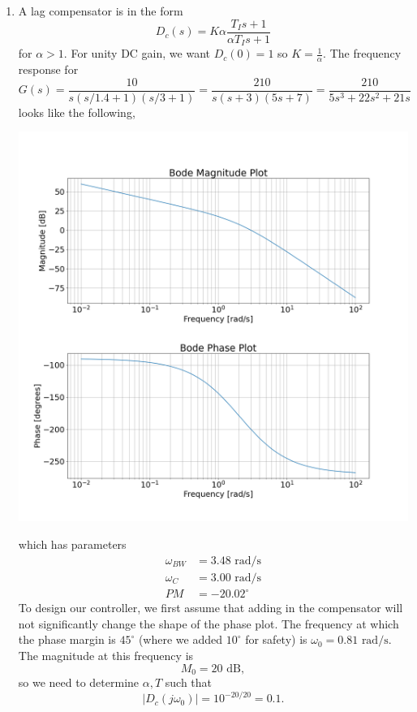 \documentclass{article}
\begin{document}
\begin{enumerate}[label=\textbf{4.\arabic*}]
\newpage
\item A lag compensator is in the form 
\begin{equation}
    D_c(s) = K \alpha \frac{T_Is+1}{\alpha T_Is + 1}
\end{equation}
for $\alpha > 1.$ For unity DC gain, we want $D_c(0)=1$ so $K=\frac{1}{\alpha}.$ The frequency response for 
\begin{equation}
    G(s) = \frac{10}{s(s/1.4+1)(s/3+1)} = \frac{210}{s (s + 3) (5 s + 7)} = \frac{210}{5 s^{3} + 22 s^{2} + 21 s}
\end{equation}
looks like the following,
\begin{center}
    \includegraphics[width=0.7\linewidth]{A4_imgs/q2_bode_nothing.png}
\end{center}
which has parameters
\begin{align}
    \omega_{BW} &= 3.48 \text{ rad/s} \\
    \omega_C &= 3.00 \text{ rad/s}\\
    PM &= -20.02^\circ
\end{align}
To design our controller, we first assume that adding in the compensator will not significantly change the shape of the phase plot. The frequency at which the phase margin is $45^\circ$ (where we added $10^\circ$ for safety) is $\omega_0 = 0.81\text{ rad/s}.$ The magnitude at this frequency is 
\begin{equation}
    M_0 = 20\text{ dB},
\end{equation}
so we need to determine $\alpha,T$ such that 
\begin{equation}
    |D_c(j\omega_0)|= 10^{-20/20} = 0.1.
\end{equation}

\end{enumerate}
\end{document}
